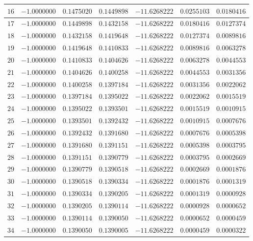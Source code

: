 \begin{center}
\begin{longtable}{|c|c|c|c|c|c|c|}
		$16$ & $-1.0000000$ & $0.1475020$ & $0.1449898$ & $-11.6268222$ & $0.0255103$ & $0.0180416$ \\ \hline
		$17$ & $-1.0000000$ & $0.1449898$ & $0.1432158$ & $-11.6268222$ & $0.0180416$ & $0.0127374$ \\ \hline
		$18$ & $-1.0000000$ & $0.1432158$ & $0.1419648$ & $-11.6268222$ & $0.0127374$ & $0.0089816$ \\ \hline
		$19$ & $-1.0000000$ & $0.1419648$ & $0.1410833$ & $-11.6268222$ & $0.0089816$ & $0.0063278$ \\ \hline
		$20$ & $-1.0000000$ & $0.1410833$ & $0.1404626$ & $-11.6268222$ & $0.0063278$ & $0.0044553$ \\ \hline
		$21$ & $-1.0000000$ & $0.1404626$ & $0.1400258$ & $-11.6268222$ & $0.0044553$ & $0.0031356$ \\ \hline
		$22$ & $-1.0000000$ & $0.1400258$ & $0.1397184$ & $-11.6268222$ & $0.0031356$ & $0.0022062$ \\ \hline
		$23$ & $-1.0000000$ & $0.1397184$ & $0.1395022$ & $-11.6268222$ & $0.0022062$ & $0.0015519$ \\ \hline
		$24$ & $-1.0000000$ & $0.1395022$ & $0.1393501$ & $-11.6268222$ & $0.0015519$ & $0.0010915$ \\ \hline
		$25$ & $-1.0000000$ & $0.1393501$ & $0.1392432$ & $-11.6268222$ & $0.0010915$ & $0.0007676$ \\ \hline
		$26$ & $-1.0000000$ & $0.1392432$ & $0.1391680$ & $-11.6268222$ & $0.0007676$ & $0.0005398$ \\ \hline
		$27$ & $-1.0000000$ & $0.1391680$ & $0.1391151$ & $-11.6268222$ & $0.0005398$ & $0.0003795$ \\ \hline
		$28$ & $-1.0000000$ & $0.1391151$ & $0.1390779$ & $-11.6268222$ & $0.0003795$ & $0.0002669$ \\ \hline
		$29$ & $-1.0000000$ & $0.1390779$ & $0.1390518$ & $-11.6268222$ & $0.0002669$ & $0.0001876$ \\ \hline
		$30$ & $-1.0000000$ & $0.1390518$ & $0.1390334$ & $-11.6268222$ & $0.0001876$ & $0.0001319$ \\ \hline
		$31$ & $-1.0000000$ & $0.1390334$ & $0.1390205$ & $-11.6268222$ & $0.0001319$ & $0.0000928$ \\ \hline
		$32$ & $-1.0000000$ & $0.1390205$ & $0.1390114$ & $-11.6268222$ & $0.0000928$ & $0.0000652$ \\ \hline
		$33$ & $-1.0000000$ & $0.1390114$ & $0.1390050$ & $-11.6268222$ & $0.0000652$ & $0.0000459$ \\ \hline
		$34$ & $-1.0000000$ & $0.1390050$ & $0.1390005$ & $-11.6268222$ & $0.0000459$ & $0.0000322$ \\ \hline

\end{longtable}
\end{center}
